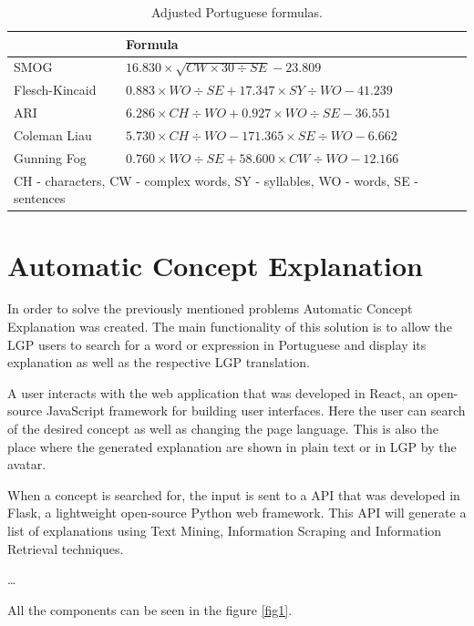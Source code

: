 \documentclass[runningheads]{llncs}
\begin{document}
\begin{table}
    \caption{Adjusted Portuguese formulas.}
    \label{table:ptformulas}
    \begin{tabular}{l|l}
        \hline
        {} & {\bfseries Formula} \\
        \hline
        SMOG & \(16.830 \times \sqrt{CW \times 30 \div SE} - 23.809\)  \\
        \hline
        Flesch-Kincaid & \(0.883 \times WO \div SE + 17.347 \times SY \div WO - 41.239\) \\
        \hline
        ARI & \(6.286 \times CH \div WO + 0.927 \times WO \div SE - 36.551\) \\
        \hline
        Coleman Liau & \(5.730 \times CH \div WO - 171.365 \times SE \div WO - 6.662\) \\
        \hline
        Gunning Fog & \(0.760 \times WO \div SE + 58.600 \times CW \div WO - 12.166\) \\
        \hline
        \multicolumn{2}{l}{CH - characters, CW - complex words, SY - syllables, WO - words, SE - sentences}
    \end{tabular}
\end{table}

\section{Automatic Concept Explanation}


In order to solve the previously mentioned problems Automatic Concept Explanation was created.
The main functionality of this solution is to allow the LGP users to search for a word or expression in Portuguese and display its explanation as well as the respective LGP translation.

A user interacts with the web application that was developed in React, an open-source JavaScript framework for building user interfaces.
Here the user can search of the desired concept as well as changing the page language.
This is also the place where the generated explanation are shown in plain text or in LGP by the avatar.

When a concept is searched for, the input is sent to a API that was developed in Flask, a lightweight open-source Python web framework.
This API will generate a list of explanations using Text Mining, Information Scraping and Information Retrieval techniques.

\dots

All the components can be seen in the figure \ref{fig1}.
\end{document}
